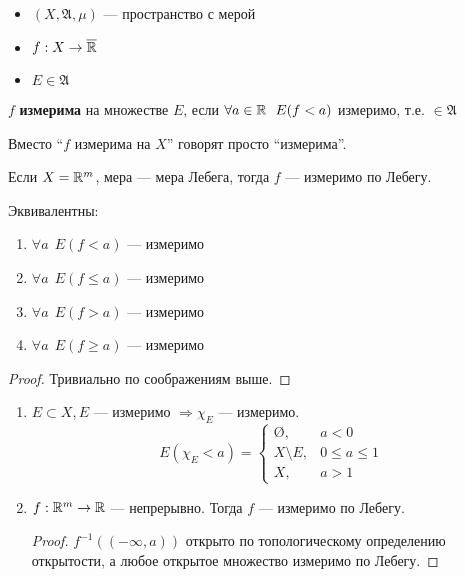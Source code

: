 \begin{definition}\itemfix
    \begin{itemize}
        \item \((X, \mathfrak{A}, \mu)\) --- пространство с мерой
        \item \(f : X \to \overline {\mathbb{R}}\)
        \item \(E\in \mathfrak{A}\)
    \end{itemize}

    \(f\) \textbf{измерима} на множестве \(E\), если \(\forall a\in\mathbb{R} \ \ E(f < a)\) измеримо, т.е. \(\in \mathfrak{A}\)
\end{definition}

Вместо ``\(f\) измерима на \(X\)'' говорят просто ``измерима''.

Если \(X = \mathbb{R}^m\), мера --- мера Лебега, тогда \(f\) --- измеримо по Лебегу.

\begin{remark}
    Эквивалентны:
    \begin{enumerate}
        \item \(\forall a \ \ E(f < a)\) --- измеримо
        \item \(\forall a \ \ E(f \leq a)\) --- измеримо
        \item \(\forall a \ \ E(f > a)\) --- измеримо
        \item \(\forall a \ \ E(f \geq a)\) --- измеримо
    \end{enumerate}
\end{remark}

\begin{proof}
    Тривиально по соображениям выше.
\end{proof}

\begin{example}\itemfix
    \begin{enumerate}
        \item \(E\subset X, E\) --- измеримо \( \Rightarrow \chi_E\) --- измеримо.
              \[E(\chi_E < a) = \begin{cases}
                      \text{\O},     & a < 0           \\
                      X \setminus E, & 0 \leq a \leq 1 \\
                      X ,            & a > 1
                  \end{cases}\]
        \item \(f:\mathbb{R}^m \to \mathbb{R}\) --- непрерывно. Тогда \(f\) --- измеримо по Лебегу.
              \begin{proof}
                  \(f^{ - 1}(( -\infty, a))\) открыто по топологическому определению открытости, а любое открытое множество измеримо по Лебегу.
              \end{proof}
    \end{enumerate}
\end{example}


